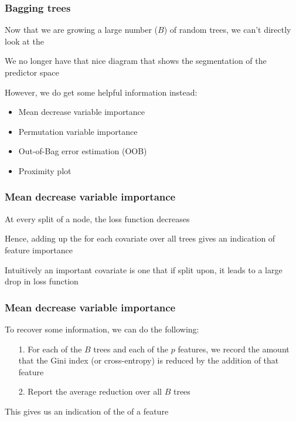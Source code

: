 \documentclass[12pt]{beamer}
\begin{document}


\begin{frame}[fragile]
\frametitle{Bagging trees}
Now that we are growing a large number ($B$) of random trees, we can't directly look at 
the 

\vsp
We no longer have that nice diagram that shows the segmentation of the predictor space 

\vsp
However, we do get some helpful information instead:

\vsp

\begin{itemize}
\item Mean decrease variable importance
\item Permutation variable importance
\item Out-of-Bag error estimation (OOB)

\item Proximity plot
\end{itemize}
\end{frame}



\begin{frame}[fragile]
\frametitle{Mean decrease variable importance}

 At every split of a node,
the loss function decreases

\vvsp
Hence, adding up the  for each covariate over all trees
gives an indication of feature importance

\vsp
Intuitively an important covariate is one that if split upon, it leads to a large drop in loss function
\end{frame}


\begin{frame}[fragile]
\frametitle{Mean decrease variable importance}
To recover some information, we can do the following:
\begin{itemize}
\item[1.] For each of the $B$ trees and each of the $p$ features, we record the amount that the Gini index 
(or cross-entropy) is reduced by the addition of that feature 
\item[2.] Report the average reduction over all $B$ trees
\end{itemize}

\vsp

This gives us an indication of the  of a feature
\end{frame}
\end{document}
